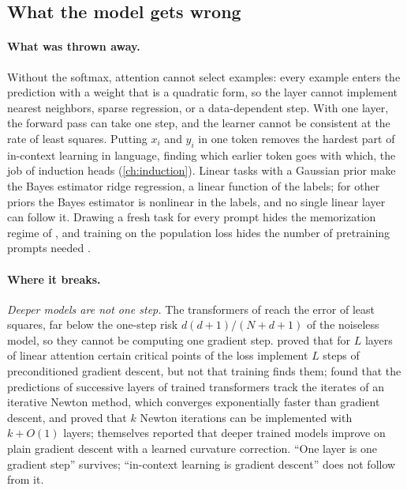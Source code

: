 \begin{refsection}
\section{What the model gets wrong}\label{sec:icl:wrong}

\paragraph{What was thrown away.} Without the softmax, attention cannot select examples: every example enters the prediction with a weight that is a quadratic form, so the layer cannot implement nearest neighbors, sparse regression, or a data-dependent step. With one layer, the forward pass can take one step, and the learner cannot be consistent at the rate of least squares. Putting $x_i$ and $y_i$ in one token removes the hardest part of in-context learning in language, finding which earlier token goes with which, the job of induction heads (\cref{ch:induction}). Linear tasks with a Gaussian prior make the Bayes estimator ridge regression, a linear function of the labels; for other priors the Bayes estimator is nonlinear in the labels, and no single linear layer can follow it. Drawing a fresh task for every prompt hides the memorization regime of \textcite{RaventosEtAl2023}, and training on the population loss hides the number of pretraining prompts needed \parencite{WuEtAl2024,LuEtAl2025}.

\paragraph{Where it breaks.} \emph{Deeper models are not one step.} The transformers of \textcite{GargEtAl2022} reach the error of least squares, far below the one-step risk $d(d+1)/(N+d+1)$ of the noiseless model, so they cannot be computing one gradient step. \Textcite{AhnEtAl2023} proved that for $L$ layers of linear attention certain critical points of the loss implement $L$ steps of preconditioned gradient descent, but not that training finds them; \textcite{FuEtAl2024} found that the predictions of successive layers of trained transformers track the iterates of an iterative Newton method, which converges exponentially faster than gradient descent, and proved that $k$ Newton iterations can be implemented with $k+O(1)$ layers; \textcite{VonOswaldEtAl2023} themselves reported that deeper trained models improve on plain gradient descent with a learned curvature correction. ``One layer is one gradient step'' survives; ``in-context learning is gradient descent'' does not follow from it.


\end{refsection}
